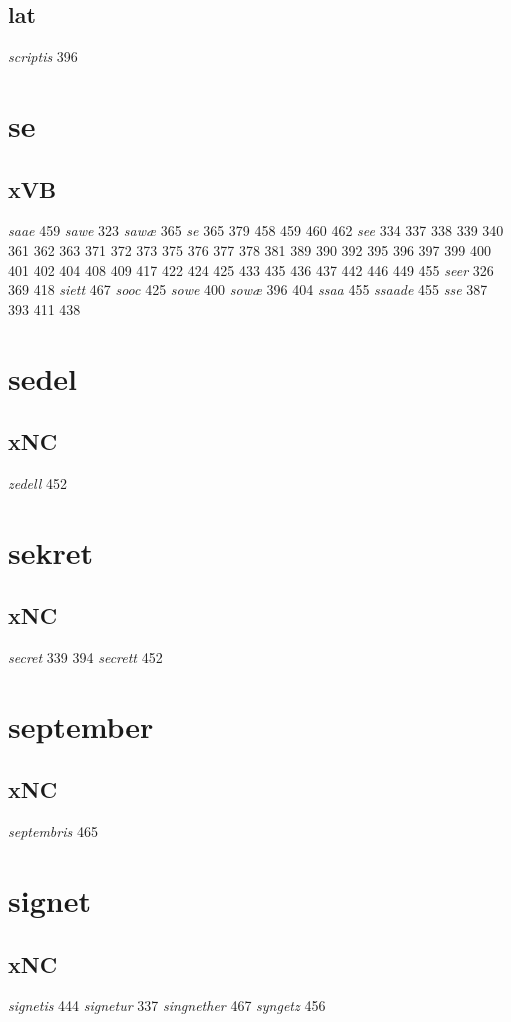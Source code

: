 \documentclass[a4paper,twocolumn]{article}
\begin{document}
\subsection{lat}
\label{sec:orge8abdee}
\emph{scriptis} 396 
\section{se}
\label{sec:org7c3e26f}
\subsection{xVB}
\label{sec:orga7370f0}
\emph{saae} 459 \emph{sawe} 323 \emph{sawæ} 365 \emph{se} 365 379 458 459 460 462 \emph{see} 334 337 338 339 340 361 362 363 371 372 373 375 376 377 378 381 389 390 392 395 396 397 399 400 401 402 404 408 409 417 422 424 425 433 435 436 437 442 446 449 455 \emph{seer} 326 369 418 \emph{siett} 467 \emph{sooc} 425 \emph{sowe} 400 \emph{sowæ} 396 404 \emph{ssaa} 455 \emph{ssaade} 455 \emph{sse} 387 393 411 438 
\section{sedel}
\label{sec:orgcc6e7e5}
\subsection{xNC}
\label{sec:org542beae}
\emph{zedell} 452 
\section{sekret}
\label{sec:orgd6dd05b}
\subsection{xNC}
\label{sec:org7827e0d}
\emph{secret} 339 394 \emph{secrett} 452 
\section{september}
\label{sec:org003eae3}
\subsection{xNC}
\label{sec:org6dc05b4}
\emph{septembris} 465 
\section{signet}
\label{sec:org2b2dac8}
\subsection{xNC}
\label{sec:org9157ce5}
\emph{signetis} 444 \emph{signetur} 337 \emph{singnether} 467 \emph{syngetz} 456 
\end{document}
